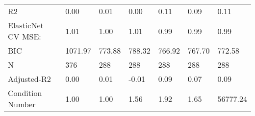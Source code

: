 \begin{table}
\begin{center}
\begin{tabular}{lllllll}
R2                                             & 0.00     & 0.01    & 0.00    & 0.11    & 0.09     & 0.11       \\
ElasticNet CV MSE:                             & 1.01     & 1.00    & 1.01    & 0.99    & 0.99     & 0.99       \\
BIC                                            & 1071.97  & 773.88  & 788.32  & 766.92  & 767.70   & 772.58     \\
N                                              & 376      & 288     & 288     & 288     & 288      & 288        \\
Adjusted-R2                                    & 0.00     & 0.01    & -0.01   & 0.09    & 0.07     & 0.09       \\
Condition Number                               & 1.00     & 1.00    & 1.56    & 1.92    & 1.65     & 56777.24   \\
\hline
\end{tabular}
\end{center}
\end{table}